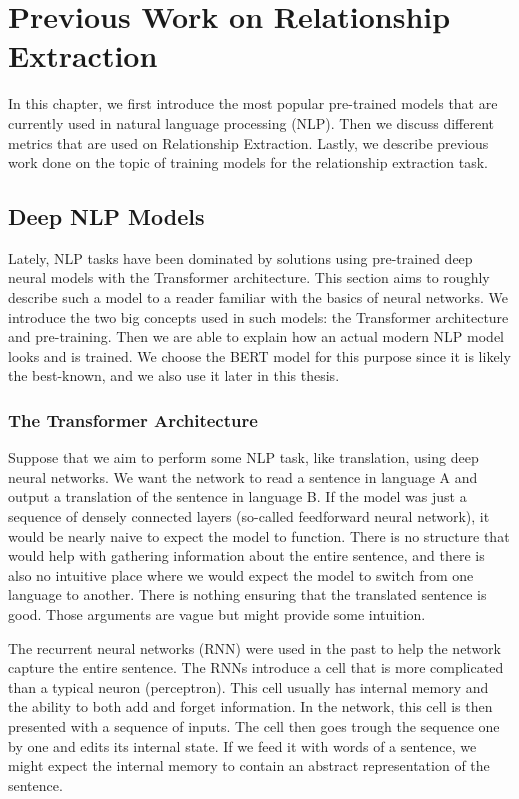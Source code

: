 \chapter{Previous Work on Relationship Extraction}
In this chapter, we first introduce the most popular pre-trained models that are currently used in natural language processing (NLP). Then we discuss different metrics that are used on Relationship Extraction. Lastly, we describe previous work done on the topic of training models for the relationship extraction task.

\section{Deep NLP Models}
Lately, NLP tasks have been dominated by solutions using pre-trained deep neural models with the Transformer architecture. This section aims to roughly describe such a model to a reader familiar with the basics of neural networks. We introduce the two big concepts used in such models: the Transformer architecture and pre-training. Then we are able to explain how an actual modern NLP model looks and is trained. We choose the BERT model for this purpose since it is likely the best-known, and we also use it later in this thesis. 



\subsection{The Transformer Architecture}
Suppose that we aim to perform some NLP task, like translation, using deep neural networks. We want the network to read a sentence in language A and output a translation of the sentence in language B. If the model was just a sequence of densely connected layers (so-called feedforward neural network), it would be nearly naive to expect the model to function. There is no structure that would help with gathering information about the entire sentence, and there is also no intuitive place where we would expect the model to switch from one language to another. There is nothing ensuring that the translated sentence is good. Those arguments are vague but might provide some intuition.

The recurrent neural networks (RNN) were used in the past to help the network capture the entire sentence. The RNNs introduce a cell that is more complicated than a typical neuron (perceptron). This cell usually has internal memory and the ability to both add and forget information. In the network, this cell is then presented with a sequence of inputs. The cell then goes trough the sequence one by one and edits its internal state. If we feed it with words of a sentence, we might expect the internal memory to contain an abstract representation of the sentence. 

